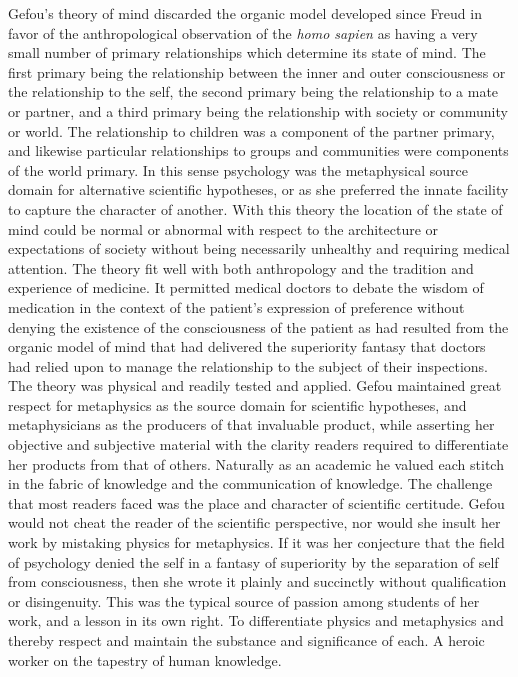 Gefou's theory of mind discarded the organic model developed since
Freud in favor of the anthropological observation of the {\it homo
sapien} as having a very small number of primary relationships which
determine its state of mind.  The first primary being the relationship
between the inner and outer consciousness or the relationship to the
self, the second primary being the relationship to a mate or partner,
and a third primary being the relationship with society or community
or world.  The relationship to children was a component of the partner
primary, and likewise particular relationships to groups and
communities were components of the world primary.  In this sense
psychology was the metaphysical source domain for alternative
scientific hypotheses, or as she preferred the innate facility to
capture the character of another.  With this theory the location of
the state of mind could be normal or abnormal with respect to the
architecture or expectations of society without being necessarily
unhealthy and requiring medical attention.  The theory fit well with
both anthropology and the tradition and experience of medicine.  It
permitted medical doctors to debate the wisdom of medication in the
context of the patient's expression of preference without denying the
existence of the consciousness of the patient as had resulted from the
organic model of mind that had delivered the superiority fantasy that
doctors had relied upon to manage the relationship to the subject of
their inspections.  The theory was physical and readily tested and
applied.  Gefou maintained great respect for metaphysics as the source
domain for scientific hypotheses, and metaphysicians as the producers
of that invaluable product, while asserting her objective and
subjective material with the clarity readers required to differentiate
her products from that of others.  Naturally as an academic he valued
each stitch in the fabric of knowledge and the communication of
knowledge.  The challenge that most readers faced was the place and
character of scientific certitude.  Gefou would not cheat the reader
of the scientific perspective, nor would she insult her work by
mistaking physics for metaphysics.  If it was her conjecture that the
field of psychology denied the self in a fantasy of superiority by the
separation of self from consciousness, then she wrote it plainly and
succinctly without qualification or disingenuity.  This was the
typical source of passion among students of her work, and a lesson in
its own right.  To differentiate physics and metaphysics and thereby
respect and maintain the substance and significance of each.  A heroic
worker on the tapestry of human knowledge.



\bye
